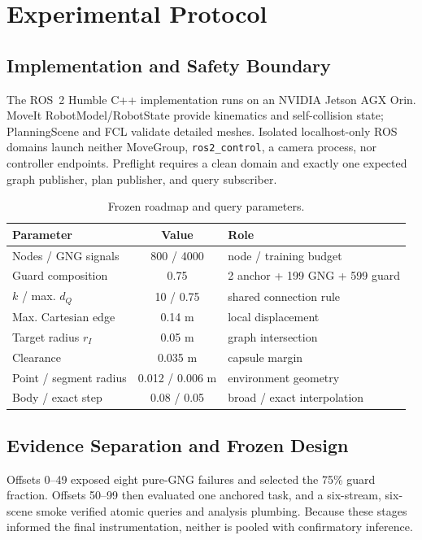 \documentclass[letterpaper,10pt,conference]{ieeeconf}
\begin{document}
\section{Experimental Protocol}
\subsection{Implementation and Safety Boundary}
The ROS~2 Humble C++ implementation runs on an NVIDIA Jetson AGX Orin. MoveIt RobotModel/RobotState provide kinematics and self-collision state; PlanningScene and FCL validate detailed meshes. Isolated localhost-only ROS domains launch neither MoveGroup, \texttt{ros2\_control}, a camera process, nor controller endpoints. Preflight requires a clean domain and exactly one expected graph publisher, plan publisher, and query subscriber.

\begin{table}[t]
\caption{Frozen roadmap and query parameters.}
\label{tab:parameters}
\centering
\scriptsize
\setlength{\tabcolsep}{3pt}
\begin{tabular}{@{}lcl@{}}
\toprule
Parameter & Value & Role \\
\midrule
Nodes / GNG signals & 800 / 4000 & node / training budget \\
Guard composition & 0.75 & 2 anchor + 199 GNG + 599 guard \\
$k$ / max. $d_Q$ & 10 / 0.75 & shared connection rule \\
Max. Cartesian edge & 0.14 m & local displacement \\
Target radius $r_I$ & 0.05 m & graph intersection \\
Clearance & 0.035 m & capsule margin \\
Point / segment radius & 0.012 / 0.006 m & environment geometry \\
Body / exact step & 0.08 / 0.05 & broad / exact interpolation \\
\bottomrule
\end{tabular}
\end{table}

\subsection{Evidence Separation and Frozen Design}
Offsets 0--49 exposed eight pure-GNG failures and selected the 75\% guard fraction. Offsets 50--99 then evaluated one anchored task, and a six-stream, six-scene smoke verified atomic queries and analysis plumbing. Because these stages informed the final instrumentation, neither is pooled with confirmatory inference.
\end{document}

